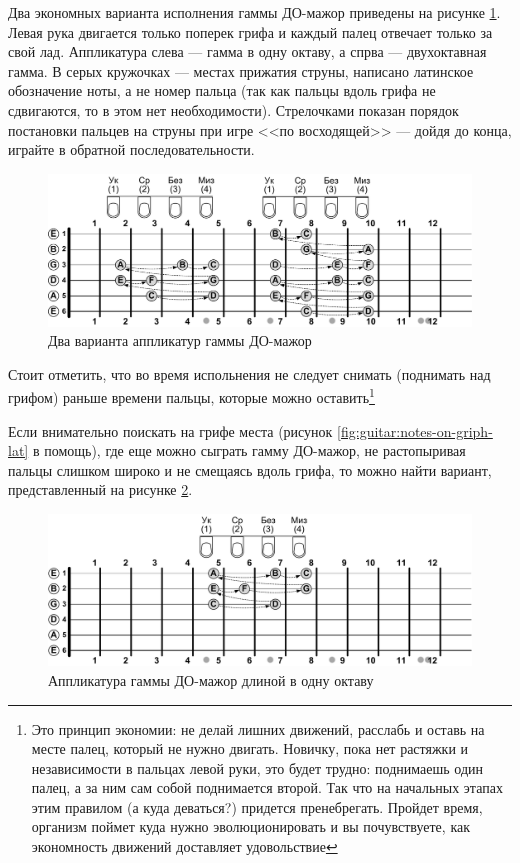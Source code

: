 Два экономных варианта исполнения гаммы ДО-мажор приведены на рисунке \ref{fig:harmony:scales:c:dur1}. Левая рука двигается только поперек грифа и каждый палец отвечает только за свой лад. Аппликатура слева --- гамма в одну октаву, а спрва --- двухоктавная гамма. В серых кружочках --- местах прижатия струны, написано латинское обозначение ноты, а не номер пальца (так как пальцы вдоль грифа не сдвигаются, то в этом нет необходимости). Стрелочками показан порядок постановки пальцев на струны при игре <<по восходящей>> --- дойдя до конца, играйте в обратной последовательности.

\begin{figure}[!ht]
    \centering
    \includegraphics[width=\textwidth]{fig/intervals/c-dur-csale-1} 
    \caption{Два варианта аппликатур гаммы ДО-мажор}\label{fig:harmony:scales:c:dur1}
\end{figure} 

Стоит отметить, что во время испольнения не следует снимать (поднимать над грифом) раньше времени пальцы, которые можно оставить\footnote{Это принцип экономии: не делай лишних движений, расслабь и оставь на месте палец, который не нужно двигать. Новичку, пока нет растяжки и независимости в пальцах левой руки, это будет трудно: поднимаешь один палец, а за ним сам собой поднимается второй. Так что на начальных этапах этим правилом (а куда деваться?) придется пренебрегать. Пройдет время, организм поймет куда нужно эволюционировать и вы почувствуете, как экономность движений доставляет удовольствие}

Если внимательно поискать на грифе места (рисунок \ref{fig:guitar:notes-on-griph-lat} в помощь), где еще можно сыграть гамму ДО-мажор, не растопыривая пальцы слишком широко и не смещаясь вдоль грифа, то можно найти вариант, представленный на рисунке \ref{fig:harmony:scales:c:dur2}.

\begin{figure}[!ht]
    \centering
    \includegraphics[width=\textwidth]{fig/intervals/c-dur-csale-2} 
    \caption{Аппликатура гаммы ДО-мажор длиной в одну октаву}\label{fig:harmony:scales:c:dur2}
\end{figure} 

